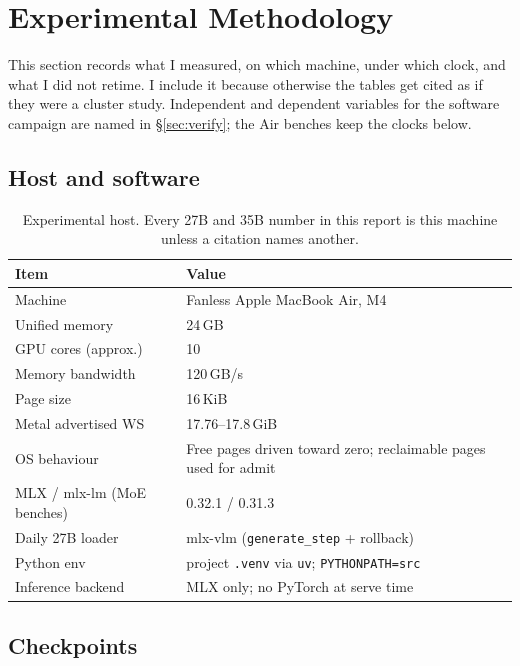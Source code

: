 \section{Experimental Methodology}
\label{sec:method}

This section records what I measured, on which machine, under which clock, and what I did not retime. I include it because otherwise the tables get cited as if they were a cluster study. Independent and dependent variables for the software campaign are named in \S\ref{sec:verify}; the Air benches keep the clocks below.

\subsection{Host and software}

\begin{table}[ht]
\centering
\caption{Experimental host. Every 27B and 35B number in this report is this machine unless a citation names another.}
\label{tab:host}
\begin{tabular}{@{}ll@{}}
\toprule
Item & Value \\
\midrule
Machine & Fanless Apple MacBook Air, M4 \\
Unified memory & 24\,GB \\
GPU cores (approx.) & 10 \\
Memory bandwidth & 120\,GB/s \\
Page size & 16\,KiB \\
Metal advertised WS & 17.76--17.8\,GiB \\
OS behaviour & Free pages driven toward zero; reclaimable pages used for admit \\
MLX / mlx-lm (MoE benches) & 0.32.1 / 0.31.3 \\
Daily 27B loader & mlx-vlm (\texttt{generate\_step} + rollback) \\
Python env & project \texttt{.venv} via \texttt{uv}; \texttt{PYTHONPATH=src} \\
Inference backend & MLX only; no PyTorch at serve time \\
\bottomrule
\end{tabular}
\end{table}

\subsection{Checkpoints}

